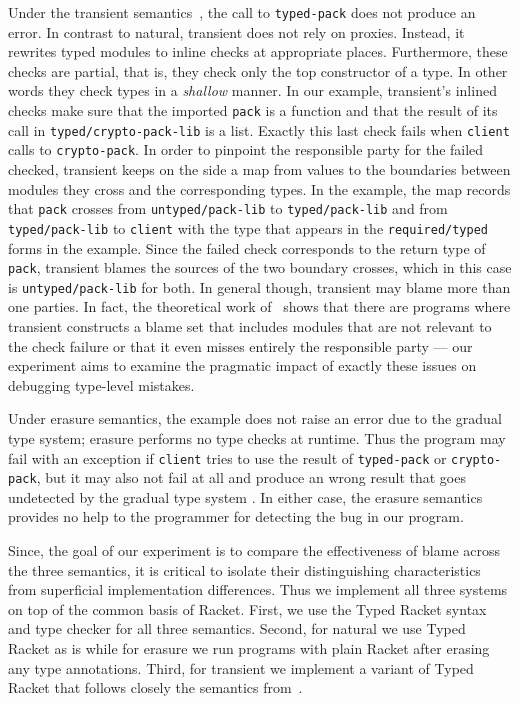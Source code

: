 Under the transient semantics~\cite{vss-popl-2017}, the call to \texttt{typed-pack} does not
produce an error. In contrast to natural, transient does not rely on
proxies. Instead, it rewrites typed modules to inline checks at appropriate
places. Furthermore, these checks are
partial, that is, they check only the top constructor of a type. In other words
they check types in a  \emph{shallow} manner. In our
example, transient's inlined checks make sure that the imported \texttt{pack} 
is a function and that the result of its call in \texttt{typed/crypto-pack-lib} is a list.   Exactly this
last check fails when \texttt{client} calls to \texttt{crypto-pack}. In
order to pinpoint the responsible party for the failed checked, transient
keeps on the side a map from values to the boundaries between modules they
cross and the corresponding types. In the example, the map records that
\texttt{pack} crosses from \texttt{untyped/pack-lib} to
\texttt{typed/pack-lib} and from \texttt{typed/pack-lib} to
\texttt{client} with the type that appears in the \texttt{required/typed}
forms in the example. Since the failed check corresponds to the return
type of \texttt{pack}, transient blames the sources of the two boundary
crosses, which in this case is \texttt{untyped/pack-lib} for both. In
general though, transient may blame more than one parties. In fact, the
theoretical work of~\citet{gfd-oopsla-2019} shows that there are programs
where transient constructs a blame set that includes modules that are not
relevant to the check failure or that it even misses entirely the responsible
party ---  our experiment aims to examine the pragmatic impact of exactly these
issues on debugging type-level mistakes.

Under erasure semantics, the example does not raise an error due to the
gradual type system; erasure performs no type checks at runtime. Thus the
program may fail with an exception if \texttt{client} tries to use the
result of \texttt{typed-pack} or \texttt{crypto-pack}, but it may also not
fail at all and produce an wrong result that goes undetected by the
gradual type system .  In either case, the erasure semantics provides no
help to the programmer for detecting the bug in our program. 

Since, the goal of our experiment is to compare the effectiveness of blame
across the three semantics, it is critical to isolate their
distinguishing characteristics from superficial implementation
differences. Thus we implement all three systems on top of the common
basis of Racket. First, we use the Typed Racket syntax and type
checker for all three semantics. Second, for natural we use Typed Racket as
is while for erasure we run programs with plain Racket after erasing any
type annotations. Third, for transient we implement a variant of Typed
Racket that follows closely the semantics from~\citet{vss-popl-2017}. 

